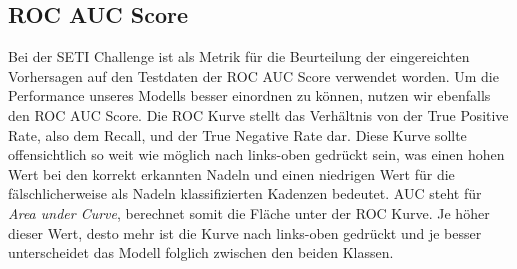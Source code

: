 \documentclass[12pt, a4paper]{article}
\begin{document}
\subsection{ROC AUC Score}
Bei der SETI Challenge ist als Metrik für die Beurteilung der eingereichten Vorhersagen auf den Testdaten der ROC AUC Score verwendet worden. Um die Performance unseres Modells besser einordnen zu können, nutzen wir ebenfalls den ROC AUC Score. Die ROC Kurve stellt das Verhältnis von der True Positive Rate, also dem Recall, und der True Negative Rate dar. Diese Kurve sollte offensichtlich so weit wie möglich nach links-oben gedrückt sein, was einen hohen Wert bei den korrekt erkannten Nadeln und einen niedrigen Wert für die fälschlicherweise als Nadeln klassifizierten Kadenzen bedeutet. AUC steht für \emph{Area under Curve}, berechnet somit die Fläche unter der ROC Kurve. Je höher dieser Wert, desto mehr ist die Kurve nach links-oben gedrückt und je besser unterscheidet das Modell folglich zwischen den beiden Klassen. 
\end{document}
